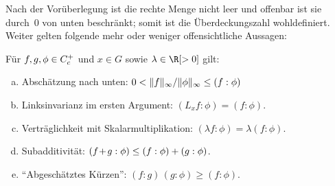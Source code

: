 Nach der Vorüberlegung ist die rechte Menge nicht leer und offenbar ist sie
durch~$0$ von unten beschränkt; somit ist die Überdeckungszahl wohldefiniert.
Weiter gelten folgende mehr oder weniger offensichtliche Aussagen:
%
\begin{thLemma}
    \label{pf:covernumprops}
    Für $f,g,\phi \in C_c^+$ und $x\in G$ sowie $\lambda\in\R[>0]$ gilt:
    \begin{enumerate}[a)]\vspace{-4pt}
        \item
            Abschätzung nach unten:\quad
            $0 < \lVert f\rVert_\infty/\lVert\phi\rVert_\infty \leq (f : \phi)$
        \item
            Linksinvarianz im ersten Argument:\quad
            $(L_xf : \phi) = (f : \phi)$.
        \item
            Verträglichkeit mit Skalarmultiplikation:\quad
            $(\lambda f : \phi) = \lambda (f : \phi)$.
        \item
            Subadditivität:\quad
            $(f\mkern1mu{+}\mkern2mu g : \phi) \leq (f : \phi) + (g : \phi)$.
        \item\label{pf:covernumprops:reducing}
            \enquote{Abgeschätztes Kürzen}:\quad
            $(f : g)\,(g : \phi) \geq (f : \phi)$.
    \end{enumerate}
\end{thLemma}

